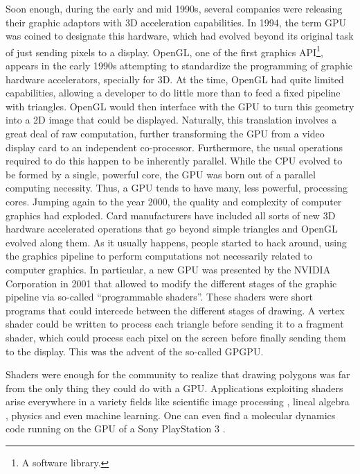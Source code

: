\documentclass[ twoside,openright,titlepage,numbers=noenddot,%
headinclude,footinclude,cleardoublepage=empty,abstract=on,
BCOR=5mm,paper=a4,fontsize=11pt, dvipsnames
]{scrreprt}
\newcommand{\gpu}{\gls{GPU}\xspace}
\begin{document}
Soon enough, during the early and mid 1990s, several companies were releasing their graphic adaptors with 3D acceleration capabilities. In 1994, the term \gpu was coined to designate this hardware, which had evolved beyond its original task of just sending pixels to a display.
OpenGL\cite{opengl}, one of the first graphics \gls{API}\footnote{A software library.}, appears in the early 1990s attempting to standardize the programming of graphic hardware accelerators, specially for 3D.
At the time, OpenGL had quite limited capabilities, allowing a developer to do little more than to feed a fixed pipeline with triangles. OpenGL would then interface with the \gpu to turn this geometry into a 2D image that could be displayed.
Naturally, this translation involves a great deal of raw computation, further transforming the \gpu from a video display card to an independent co-processor. Furthermore,  the usual operations required to do this happen to be inherently parallel. While the CPU evolved to be formed by a single, powerful core, the \gpu was born out of a parallel computing necessity. Thus, a \gpu tends to have many, less powerful, processing cores.
Jumping again to the year 2000, the quality and complexity of computer graphics had exploded. Card manufacturers have included all sorts of new 3D hardware accelerated operations that go beyond simple triangles and OpenGL evolved along them. As it usually happens, people started to hack around, using the graphics pipeline to perform computations not necessarily related to computer graphics. In particular, a new \gpu was presented by the NVIDIA Corporation in 2001 that allowed to modify the different stages of the graphic pipeline via so-called ``programmable shaders''. These shaders were short programs that could intercede between the different stages of drawing. A vertex shader could be written to process each triangle before sending it to a fragment shader, which could process each pixel on the screen before finally sending them to the display. This was the advent of the so-called \gls{GPGPU}.

Shaders were enough for the community to realize that drawing polygons was far from the only thing they could do with a \gpu\cite{gpgpu2002}. Applications exploiting shaders arise everywhere in a variety fields like scientific image processing \cite{gpuimage2003, gpuimage2006}, lineal algebra \cite{gpulinalg2001, gpulinalg2003a, gpulinalg2003b}, physics \cite{gpulbm2004} and even machine learning\cite{gpuml2005, gpuml1998}. One can even find a molecular dynamics code running on the \gpu of a Sony PlayStation 3 \cite{ps3md2009}.
\end{document}
